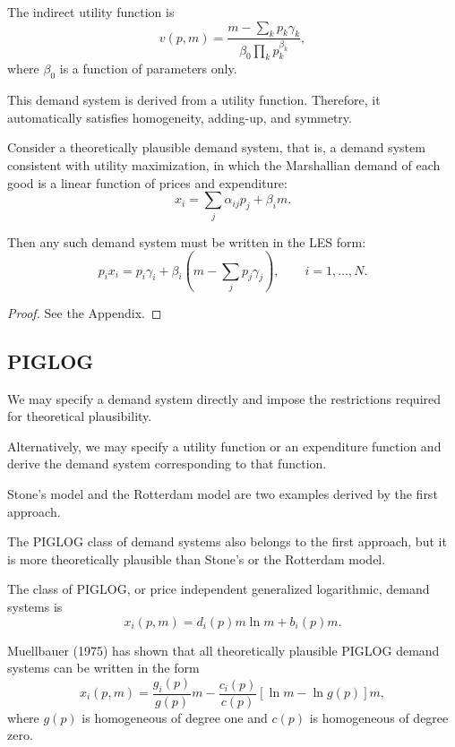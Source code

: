 The indirect utility function is
\[
v(p,m)
=
\frac{
m-\sum_k p_k\gamma_k
}{
\beta_0\prod_k p_k^{\beta_k}
},
\]
where \(\beta_0\) is a function of parameters only.

This demand system is derived from a utility function. Therefore, it automatically satisfies homogeneity, adding-up, and symmetry.

\begin{theorem}
Consider a theoretically plausible demand system, that is, a demand system consistent with utility maximization, in which the Marshallian demand of each good is a linear function of prices and expenditure:
\[
x_i
=
\sum_j \alpha_{ij}p_j
+
\beta_i m.
\]



\end{theorem}





Then any such demand system must be written in the LES form:
\[
p_i x_i
=
p_i\gamma_i
+
\beta_i
\left(
m-\sum_j p_j\gamma_j
\right),
\qquad
i=1,\dots,N.
\]

\begin{proof}
See the Appendix.
\end{proof}

\subsection{PIGLOG}

We may specify a demand system directly and impose the restrictions required for theoretical plausibility.

Alternatively, we may specify a utility function or an expenditure function and derive the demand system corresponding to that function.

Stone's model and the Rotterdam model are two examples derived by the first approach.

The PIGLOG class of demand systems also belongs to the first approach, but it is more theoretically plausible than Stone's or the Rotterdam model.

The class of PIGLOG, or price independent generalized logarithmic, demand systems is
\[
x_i(p,m)
=
d_i(p)m\ln m
+
b_i(p)m.
\]

Muellbauer (1975) has shown that all theoretically plausible PIGLOG demand systems can be written in the form
\[
x_i(p,m)
=
\frac{g_i(p)}{g(p)}m
-
\frac{c_i(p)}{c(p)}
\left[
\ln m-\ln g(p)
\right]m,
\]
where \(g(p)\) is homogeneous of degree one and \(c(p)\) is homogeneous of degree zero.

